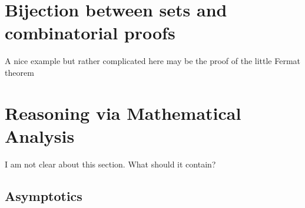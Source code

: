 \section{Bijection between sets and combinatorial proofs}

{\Denis A nice example but rather complicated here may be the proof of the little Fermat theorem}


\section{Reasoning via Mathematical Analysis}
\label{sec:analysis}

{\Denis I am not clear about this section.
What should it contain?}

%
%
%


\subsection{Asymptotics}
\label{sec:asymptotics}


